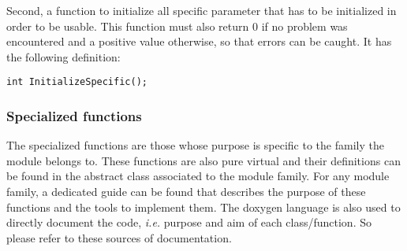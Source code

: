 \documentclass[a4paper, 11pt]{article}
\begin{document}
Second, a function to initialize all specific parameter that has to be initialized in order to be usable.
This function must also return 0 if no problem was encountered and a positive value otherwise, so that errors can be caught.
It has the following definition:
\begin{lstlisting}[label={InitializeSpecific},caption=Function to initialize all pecular stuff to your module.]
int InitializeSpecific();
\end{lstlisting}

\subsubsection{Specialized functions}

The specialized functions are those whose purpose is specific to the family the module belongs to.
These functions are also pure virtual and their definitions can be found in the abstract class associated to the module family.
For any module family, a dedicated guide can be found that describes the purpose of these functions and the tools to implement them.
The doxygen language is also used to directly document the code, \textit{i.e.} purpose and aim of each class/function.
So please refer to these sources of documentation.
\end{document}
